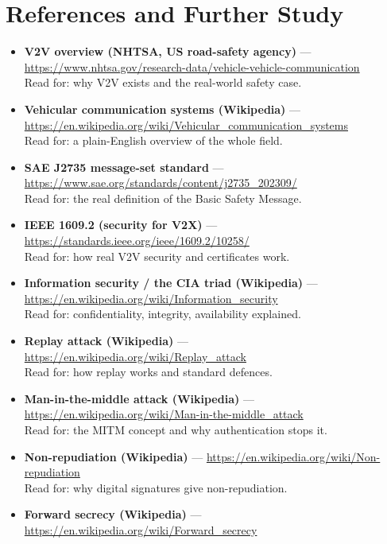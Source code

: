 \documentclass[11pt,a4paper]{article}
\begin{document}
\section{References and Further Study}
\begin{itemize}
  \item \textbf{V2V overview (NHTSA, US road-safety agency)} ---
        \url{https://www.nhtsa.gov/research-data/vehicle-vehicle-communication}\\
        Read for: why V2V exists and the real-world safety case.
  \item \textbf{Vehicular communication systems (Wikipedia)} ---
        \url{https://en.wikipedia.org/wiki/Vehicular_communication_systems}\\
        Read for: a plain-English overview of the whole field.
  \item \textbf{SAE J2735 message-set standard} ---
        \url{https://www.sae.org/standards/content/j2735_202309/}\\
        Read for: the real definition of the Basic Safety Message.
  \item \textbf{IEEE 1609.2 (security for V2X)} ---
        \url{https://standards.ieee.org/ieee/1609.2/10258/}\\
        Read for: how real V2V security and certificates work.
  \item \textbf{Information security / the CIA triad (Wikipedia)} ---
        \url{https://en.wikipedia.org/wiki/Information_security}\\
        Read for: confidentiality, integrity, availability explained.
  \item \textbf{Replay attack (Wikipedia)} ---
        \url{https://en.wikipedia.org/wiki/Replay_attack}\\
        Read for: how replay works and standard defences.
  \item \textbf{Man-in-the-middle attack (Wikipedia)} ---
        \url{https://en.wikipedia.org/wiki/Man-in-the-middle_attack}\\
        Read for: the MITM concept and why authentication stops it.
  \item \textbf{Non-repudiation (Wikipedia)} ---
        \url{https://en.wikipedia.org/wiki/Non-repudiation}\\
        Read for: why digital signatures give non-repudiation.
  \item \textbf{Forward secrecy (Wikipedia)} ---
        \url{https://en.wikipedia.org/wiki/Forward_secrecy}\\

\end{itemize}
\end{document}
